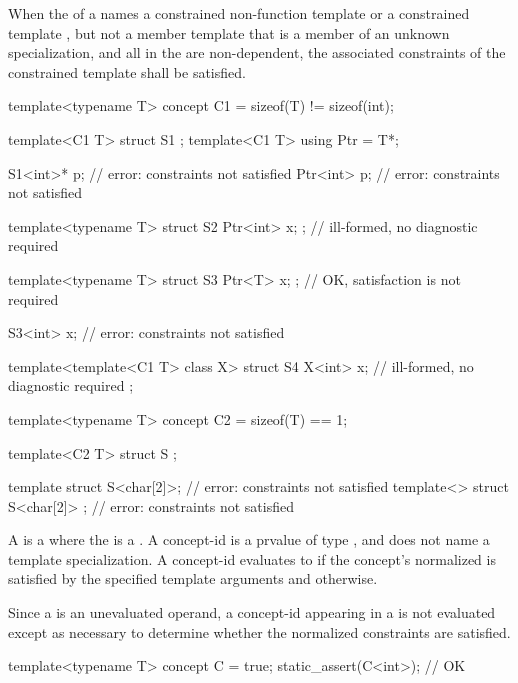 \pnum
When the 
of a 
names a constrained non-function template
or
a constrained template ,
but not a member template
that is a member of an unknown specialization,
and
all 
in the 
are non-dependent,
the associated constraints
of the constrained template
shall be satisfied.
\begin{example}
\begin{codeblock}
template<typename T> concept C1 = sizeof(T) != sizeof(int);

template<C1 T> struct S1 { };
template<C1 T> using Ptr = T*;

S1<int>* p;                         // error: constraints not satisfied
Ptr<int> p;                         // error: constraints not satisfied

template<typename T>
struct S2 { Ptr<int> x; };          // ill-formed, no diagnostic required

template<typename T>
struct S3 { Ptr<T> x; };            // OK, satisfaction is not required

S3<int> x;                          // error: constraints not satisfied

template<template<C1 T> class X>
struct S4 {
  X<int> x;                         // ill-formed, no diagnostic required
};

template<typename T> concept C2 = sizeof(T) == 1;

template<C2 T> struct S { };

template struct S<char[2]>;         // error: constraints not satisfied
template<> struct S<char[2]> { };   // error: constraints not satisfied
\end{codeblock}
\end{example}

\pnum
A  is a 
where the  is a .
A concept-id is a prvalue of type , and
does not name a template specialization.
A concept-id evaluates to 
if the concept's
normalized 
is satisfied by the specified template arguments and
 otherwise.
\begin{note}
Since a  is an unevaluated operand,
a concept-id appearing in a 
is not evaluated except as necessary
to determine whether the normalized constraints are satisfied.
\end{note}
\begin{example}
\begin{codeblock}
template<typename T> concept C = true;
static_assert(C<int>);      // OK
\end{codeblock}
\end{example}

